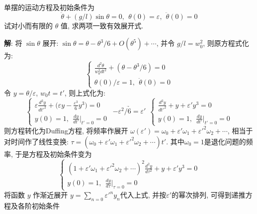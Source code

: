 \begin{problem}[习题7.2]
单摆的运动方程及初始条件为
\[
\ddot{\theta} + (g/l)\sin\theta = 0, ~~ \theta(0)=\varepsilon, ~~ \ddot{\theta}(0) = 0
\]
试对小而有限的 $\theta$ 值, 求两项一致有效展开式.
\end{problem}

\begin{solution}
\textbf{解}: 将 $\sin\theta$ 展开: $\sin\theta=\theta -\theta^3/6+O(\theta^5)+\cdots$, 并令 $g/l=w_0^2$,
 则原方程式化为:
\begin{displaymath}
\left\{ \begin{array}{l}
\displaystyle\frac{d^2\theta}{w_0^2 dt^2} + (\theta-\theta^3/6) = 0\\
\displaystyle\theta(0)/\varepsilon = 1, ~~  \ddot{\theta}(0) = 0
\end{array}\right.
\end{displaymath}
令 $y=\theta/\varepsilon$, $w_0 t = t'$, 则上式化为:
\begin{displaymath}
\left\{ \begin{array}{l}
\displaystyle \varepsilon\frac{d^2y}{dt'^2} + \Big(\varepsilon y- \frac{\varepsilon^3}{6} y^3\Big) = 0\\
\displaystyle y(0) = 1, ~~  \frac{dy}{dt'}\Big|_{t'=0} = 0
\end{array}\right. ~~ \underrightarrow{-\varepsilon^2/6=\varepsilon'} ~~
\left\{ \begin{array}{l}
\displaystyle \frac{d^2y}{dt'^2} +  y + \varepsilon' y^3 = 0\\
\displaystyle y(0) = 1, ~~  \frac{dy}{dt'}\Big|_{t'=0} = 0
\end{array}\right.
\end{displaymath}
则方程转化为Duffing方程, 将频率作展开 $\omega(\varepsilon')= \omega_0 + \varepsilon'\omega_1 + \varepsilon'^2\omega_2 + \cdots $, 相当于对时间作了线性变换:
$\tau = (\omega_0 + \varepsilon'\omega_1 + \varepsilon'^2\omega_2 + \cdots) t'$.  其中$\omega_0 = 1$是退化问题的频率, 于是方程及初始条件变为
\begin{displaymath}
\left\{ \begin{array}{l}
\displaystyle (1 + \varepsilon'\omega_1 + \varepsilon'^2\omega_2 + \cdots)^2 \frac{d^2y}{d\tau^2} +  y + \varepsilon' y^3 = 0\\
\displaystyle y(0) = 1, ~~  \frac{dy}{d\tau}\Big|_{\tau=0} = 0
\end{array}\right.
\end{displaymath}
将函数 $y$ 作渐近展开 $y=\sum_{n=0}\varepsilon'^n y_n$代入上式, 并按$\varepsilon'$的幂次排列, 可得到递推方程及各阶初始条件

\end{solution}

